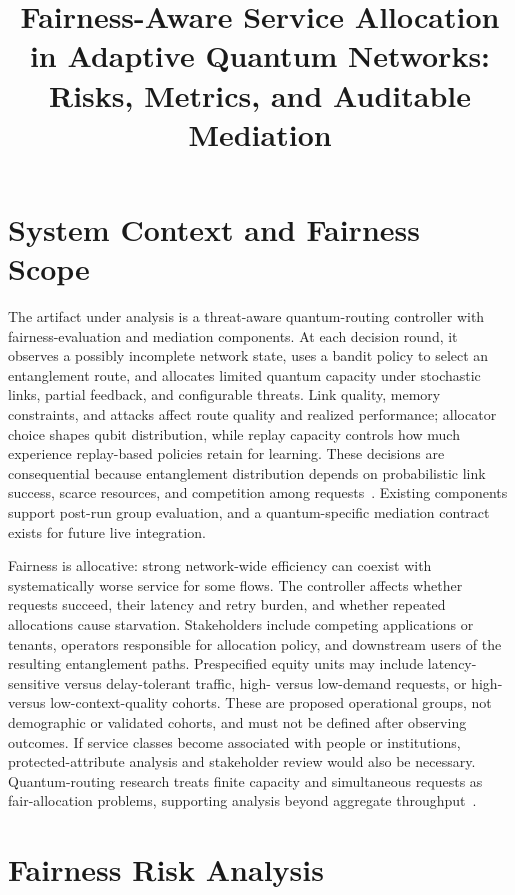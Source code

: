 \documentclass[10pt,conference]{IEEEtran}
\title{Fairness-Aware Service Allocation in Adaptive Quantum Networks:\\
Risks, Metrics, and Auditable Mediation}
\author{\IEEEauthorblockN{Piter Garcia}
\IEEEauthorblockA{Focus Area: Fairness\\
Capstone: Fairness-Aware Adaptive Routing for Quantum Networks}}
\begin{document}
\maketitle

\section{System Context and Fairness Scope}

The artifact under analysis is a threat-aware quantum-routing controller with
fairness-evaluation and mediation components. At each decision round, it
observes a possibly incomplete network state, uses a bandit policy to select an
entanglement route, and allocates limited quantum capacity under stochastic
links, partial feedback, and configurable threats. Link quality, memory
constraints, and attacks affect route quality and realized performance;
allocator choice shapes qubit distribution, while replay capacity controls how
much experience replay-based policies retain for learning.
These decisions are consequential because entanglement distribution depends on
probabilistic link success, scarce resources, and competition among
requests~\cite{wehner2018quantum,pant2019routing}. Existing components support
post-run group evaluation, and a quantum-specific mediation contract exists for
future live integration.

Fairness is allocative: strong network-wide efficiency can coexist with
systematically worse service for some flows. The controller affects whether
requests succeed, their latency and retry burden, and whether repeated
allocations cause starvation. Stakeholders include competing applications or
tenants, operators responsible for allocation policy, and downstream users of
the resulting entanglement paths. Prespecified equity units may include
latency-sensitive versus delay-tolerant traffic, high- versus low-demand
requests, or high- versus low-context-quality cohorts. These are proposed
operational groups, not demographic or validated cohorts, and must not be
defined after observing outcomes. If service classes become associated with
people or institutions, protected-attribute analysis and stakeholder review
would also be necessary. Quantum-routing research treats finite capacity and
simultaneous requests as fair-allocation problems, supporting analysis beyond
aggregate throughput~\cite{li2021effective,cicconetti2023service}.

\section{Fairness Risk Analysis}
\end{document}
